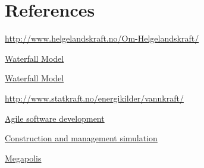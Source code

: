 \chapter{References}

\begin{thebibliography}{99}

	\href {http://www.helgelandskraft.no/Om-Helgelandskraft/}{http://www.helgelandskraft.no/Om-Helgelandskraft/}

	\href {http://en.wikipedia.org/wiki/Waterfall_model}{Waterfall Model}

	\href {http://searchsoftwarequality.techtarget.com/definition/waterfall-model}{Waterfall Model}

	\href {http://www.statkraft.no/energikilder/vannkraft/}{http://www.statkraft.no/energikilder/vannkraft/}

	\href {http://en.wikipedia.org/wiki/Agile_software_development}{Agile software development}

	\href {http://en.wikipedia.org/wiki/Construction_and_management_simulation}{Construction and management simulation}

	\href {https://play.google.com/store/apps/details?id=com.socialquantum.acityint}{Megapolis}

\end{thebibliography}